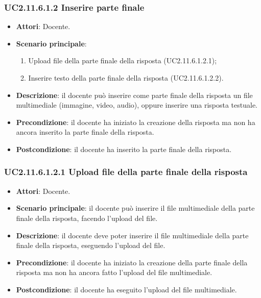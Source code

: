 \subsubsection{UC2.11.6.1.2 Inserire parte finale}
\begin{itemize}
\item \textbf{Attori}: Docente.
\item \textbf{Scenario principale}:
\begin{enumerate}
\item Upload file della parte finale della risposta (UC2.11.6.1.2.1);
\item Inserire testo della parte finale della risposta (UC2.11.6.1.2.2).
\end{enumerate}
\item \textbf{Descrizione}: il docente può inserire come parte finale della risposta un file multimediale (immagine, video, audio), oppure inserire una risposta testuale.
\item \textbf{Precondizione}: il docente ha iniziato la creazione della risposta ma non ha ancora inserito la parte finale della risposta.
\item \textbf{Postcondizione}: il docente ha inserito la parte finale della risposta.
\end{itemize}
\subsubsection{UC2.11.6.1.2.1 Upload file della parte finale della risposta}
\begin{itemize}
\item \textbf{Attori}: Docente.
\item \textbf{Scenario principale}: il docente può inserire il file multimediale della parte finale della risposta, facendo l'upload del file.
\item \textbf{Descrizione}: il docente deve poter inserire il file multimediale della parte finale della risposta, eseguendo l'upload del file.
\item \textbf{Precondizione}: il docente ha iniziato la creazione della parte finale della risposta ma non ha ancora fatto l'upload del file multimediale.
\item \textbf{Postcondizione}: il docente ha eseguito l'upload del file multimediale.
\end{itemize}
